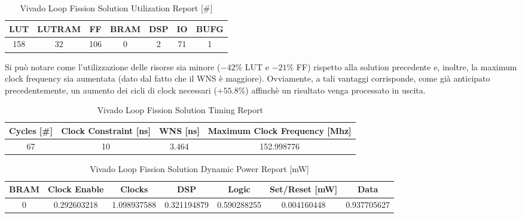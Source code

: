\begin{table}[H]
    \centering
    \begin{tabular}{|c|c|c|c|c|c|c|}
        \hline
        \textbf{LUT} & \textbf{LUTRAM} & \textbf{FF} & \textbf{BRAM} & \textbf{DSP} & \textbf{IO} & \textbf{BUFG} \\
        \hline
        158 & 32 & 106 & 0 & 2 & 71 & 1 \\
        \hline
    \end{tabular}
    \caption{Vivado Loop Fission Solution Utilization Report [\#]}
    \label{tab:vivado-loop-fission-solution-utilization-reproot}
\end{table}

Si può notare come l'utilizzazione delle risorse sia minore ($-42\%$ LUT e $-21\%$ FF) rispetto alla solution precedente e, inoltre, la maximum clock frequency sia aumentata (dato dal fatto che il WNS è maggiore). Ovviamente, a tali vantaggi corrisponde, come già anticipato precedentemente, un aumento dei cicli di clock necessari ($+55.8\%$) affinchè un risultato venga processato in uscita.

\begin{table}[H]
    \centering
    \begin{tabular}{|c|c|c|c|}
        \hline
        \textbf{Cycles} [\#] & \textbf{Clock Constraint} [ns] & \textbf{WNS} [ns] & \textbf{Maximum Clock Frequency} [Mhz] \\
        \hline
        67 & 10 & 3.464 & 152.998776 \\
        \hline
    \end{tabular}
    \caption{Vivado Loop Fission Solution Timing Report}
    \label{tab:vivado-loop-fission-solution-timing-reproot}
\end{table}

\begin{table}[H]
    \centering
    \begin{tabular}{|c|c|c|c|c|c|c|}
        \hline
        \textbf{BRAM} & \textbf{Clock Enable} & \textbf{Clocks} & \textbf{DSP} & \textbf{Logic} & \textbf{Set/Reset} [mW] & \textbf{Data} \\
        \hline
        0 & 0.292603218 & 1.098937588 & 0.321194879 & 0.590288255 & 0.004160448 & 0.937705627 \\
        \hline
    \end{tabular}
    \caption{Vivado Loop Fission Solution Dynamic Power Report [mW]}
    \label{tab:vivado-loop-fission-solution-dynamic-power-reproot}
\end{table}

